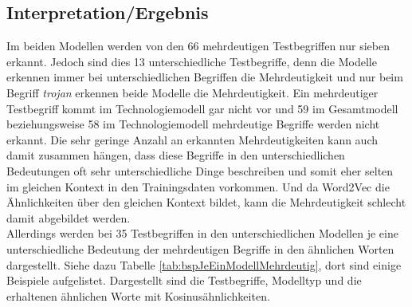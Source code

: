 \documentclass[12pt,a4paper]{report}
\begin{document}
		
		\subsection*{Interpretation/Ergebnis}
		


		
		Im beiden Modellen werden von den 66 mehrdeutigen Testbegriffen nur sieben erkannt. Jedoch sind dies 13 unterschiedliche Testbegriffe, denn die Modelle erkennen immer bei unterschiedlichen Begriffen die Mehrdeutigkeit und nur beim Begriff \textit{trojan} erkennen beide Modelle die Mehrdeutigkeit. Ein mehrdeutiger Testbegriff kommt im Technologiemodell gar nicht vor und 59 im Gesamtmodell beziehungsweise 58 im Technologiemodell mehrdeutige Begriffe werden nicht erkannt. Die sehr geringe Anzahl an erkannten Mehrdeutigkeiten kann auch damit zusammen hängen, dass diese Begriffe in den unterschiedlichen Bedeutungen oft sehr unterschiedliche Dinge beschreiben und somit eher selten im gleichen Kontext in den Trainingsdaten vorkommen. Und da Word2Vec die Ähnlichkeiten über den gleichen Kontext bildet, kann die Mehrdeutigkeit schlecht damit abgebildet werden.\\
Allerdings werden bei 35 Testbegriffen in den unterschiedlichen Modellen je eine unterschiedliche Bedeutung der mehrdeutigen Begriffe in den ähnlichen Worten dargestellt. Siehe dazu Tabelle \ref{tab:bspJeEinModellMehrdeutig}, dort sind einige Beispiele aufgelistet. Dargestellt sind die Testbegriffe, Modelltyp und die erhaltenen ähnlichen Worte mit Kosinusähnlichkeiten.\\
		
\end{document}
